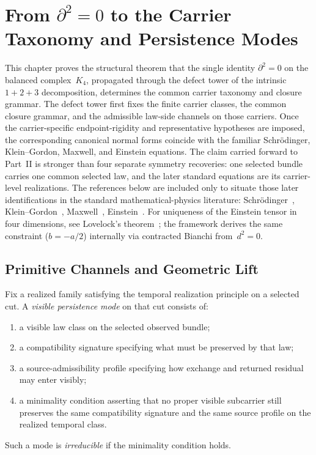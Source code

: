 \section{From $\partial^2=0$ to the Carrier Taxonomy and Persistence Modes}
\label{sec:carrier-forcing}

This chapter proves the structural theorem that the single identity
$\partial^2=0$ on the balanced complex~$K_4$, propagated through the defect
tower of the intrinsic $1{+}2{+}3$ decomposition, determines the common carrier
taxonomy and closure grammar. The defect tower first fixes the finite carrier
classes, the common closure grammar, and the admissible law-side channels on
those carriers. Once the carrier-specific endpoint-rigidity and representative
hypotheses are imposed, the corresponding canonical normal forms coincide with
the familiar Schr\"odinger, Klein--Gordon, Maxwell, and Einstein equations.
The claim carried forward to Part~II is stronger than four separate symmetry
recoveries: one selected bundle carries one common selected law, and the later
standard equations are its carrier-level realizations.
The references below are included only to situate those later identifications
in the standard mathematical-physics literature:
Schr\"odinger~\cite{Schrodinger1926,Sakurai2020},
Klein--Gordon~\cite{Klein1926,Gordon1926,PeskinSchroeder1995},
Maxwell~\cite{Maxwell1865,Jackson1999},
Einstein~\cite{Einstein1915,Wald1984}. For uniqueness of the Einstein tensor
in four dimensions, see Lovelock's theorem~\cite{Lovelock1971}; the framework
derives the same constraint ($b=-a/2$) internally via contracted Bianchi
from~$d^2=0$.

\subsection{Primitive Channels and Geometric Lift}

\begin{definition}
\label{def:visible-persistence-mode}
Fix a realized family satisfying the temporal realization principle on a
selected cut. A \emph{visible persistence mode} on that cut consists of:
\begin{enumerate}[label=(\roman*), leftmargin=2em, itemsep=0.2em]
\item a visible law class on the selected observed bundle;
\item a compatibility signature specifying what must be preserved by that law;
\item a source-admissibility profile specifying how exchange and returned
      residual may enter visibly;
\item a minimality condition asserting that no proper visible subcarrier still
      preserves the same compatibility signature and the same source profile on
      the realized temporal class.
\end{enumerate}
Such a mode is \emph{irreducible} if the minimality condition holds.
\end{definition}

